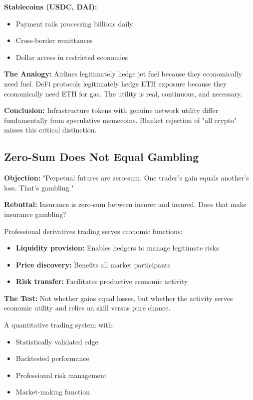 \documentclass[10pt,twocolumn]{article}
\begin{document}
\textbf{Stablecoins (USDC, DAI):}
\begin{itemize}
    \item Payment rails processing billions daily
    \item Cross-border remittances
    \item Dollar access in restricted economies
\end{itemize}

\textbf{The Analogy:} Airlines legitimately hedge jet fuel because they economically need fuel. DeFi protocols legitimately hedge ETH exposure because they economically need ETH for gas. The utility is real, continuous, and necessary.

\textbf{Conclusion:} Infrastructure tokens with genuine network utility differ fundamentally from speculative memecoins. Blanket rejection of "all crypto" misses this critical distinction.

\subsection{Zero-Sum Does Not Equal Gambling}

\textbf{Objection:} "Perpetual futures are zero-sum. One trader's gain equals another's loss. That's gambling."

\textbf{Rebuttal:} Insurance is zero-sum between insurer and insured. Does that make insurance gambling?

Professional derivatives trading serves economic functions:
\begin{itemize}
    \item \textbf{Liquidity provision:} Enables hedgers to manage legitimate risks
    \item \textbf{Price discovery:} Benefits all market participants
    \item \textbf{Risk transfer:} Facilitates productive economic activity
\end{itemize}

\textbf{The Test:} Not whether gains equal losses, but whether the activity serves economic utility and relies on skill versus pure chance.

A quantitative trading system with:
\begin{itemize}
    \item Statistically validated edge
    \item Backtested performance
    \item Professional risk management
    \item Market-making function
\end{itemize}
\end{document}
